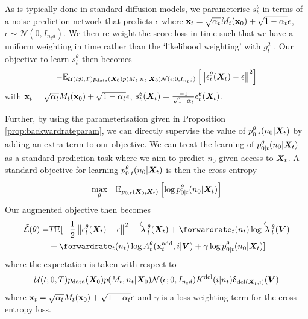 As is typically done in standard diffusion models, we parameterise $s_t^\theta$ in terms of a noise prediction network that predicts $\epsilon$ where ${\mathbf{x}}_t = \sqrt{\alpha_t}M_t({\mathbf{x}}_0) + \sqrt{1- \alpha_t} \epsilon$, $\epsilon \sim \mathcal{N}(0, I_{n_t d})$. We then re-weight the score loss in time such that we have a uniform weighting in time rather than the `likelihood weighting' with $g_t^2$ \citet{song2020score, song2021maximum}. Our objective to learn $s_t^\theta$ then becomes
\begin{equation}
    - \mathbb{E}_{\mathcal{U}(t; 0, T) p_{\rm{data}}({\bm{X}}_0) p(M_t, n_t | {\bm{X}}_0) \mathcal{N}(\epsilon; 0, I_{n_t d})} \left[ \left\lVert\epsilon_t^\theta({\bm{X}}_t) - \epsilon\right\rVert^2 \right]
\end{equation}
with ${\mathbf{x}}_t = \sqrt{\alpha_t} M_t({\mathbf{x}}_0) + \sqrt{1 - \alpha_t} \epsilon$, $s_t^\theta({\bm{X}}_t) = \frac{-1}{\sqrt{1-\alpha_t}} \epsilon_t^\theta({\bm{X}}_t)$.

Further, by using the parameterisation given in Proposition \ref{prop:backwardrateparam}, we can directly supervise the value of $p_{0|t}^\theta(n_0 | {\bm{X}}_t)$ by adding an extra term to our objective. We can treat the learning of $p_{0|t}^\theta(n_0 | {\bm{X}}_t)$ as a standard prediction task where we aim to predict $n_0$ given access to ${\bm{X}}_t$. A standard objective for learning $p_{0|t}^\theta(n_0 | {\bm{X}}_t)$ is then the cross entropy
\begin{equation}
    \underset{\theta}{\text{max}} \quad \mathbb{E}_{p_{0,t}({\bm{X}}_0, {\bm{X}}_t)} \left[ \log p_{0|t}^{\theta}(n_0 | {\bm{X}}_t) \right] 
\end{equation}
Our augmented objective then becomes
\begin{align}
    \tilde{\mathcal{L}}(\theta) = &T\mathbb{E} [ -\frac{1}{2}\norm{\epsilon_t^\theta(\mX_t) - \epsilon}^2 - \backwardrate_t^\theta(\mX_t) + \forwardrate_t(n_t) \log \backwardrate_t^\theta(\mV) \\ 
    &+ \forwardrate_t(n_t) \log \autonet_t^\theta(\xadd_t, i | \mV) + \gamma \log p_{0|t}^\theta (n_0 | \mX_t) ] \nonumber
    \label{eq:augmentedObjective}
\end{align}
where the expectation is taken with respect to 
\begin{equation}
\mathcal{U}(t; 0, T) p_{\rm{data}}({\bm{X}}_0) p(M_t, n_t | {\bm{X}}_0) \mathcal{N}(\epsilon; 0, I_{n_t d}) K^{\textup{del}}(i | n_t) \updelta_{\text{del}({\bm{X}}_t, i)}({\bm{V}})
\end{equation}
where ${\mathbf{x}}_t = \sqrt{\alpha_t} M_t({\mathbf{x}}_0) + \sqrt{1 - \alpha_t} \epsilon$ and $\gamma$ is a loss weighting term for the cross entropy loss.


